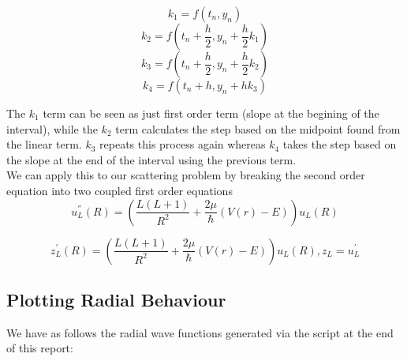\documentclass[11pt]{article} %
\begin{document}
\begin{equation}
k_1=f(t_n,y_n)
\end{equation}
\begin{equation}
k_2=f(t_n+\frac{h}{2},y_n+\frac{h}{2}k_1)
\end{equation}
\begin{equation}
k_3=f(t_n+\frac{h}{2},y_n+\frac{h}{2}k_2)
\end{equation}
\begin{equation}
k_4=f(t_n+h,y_n+hk_3)
\end{equation}

The $k_1$ term can be seen as just first order term (slope at the begining of the interval), while the $k_2$ term calculates the step based on the midpoint found from the linear term.  
$k_3$ repeats this process again whereas $k_4$ takes the step based on the slope at the end of the interval using the previous term. \\
We can apply this to our scattering problem by breaking the second order equation into two coupled first order equations
\begin{equation}
u_{L}^{''}(R)=\left(\frac{L(L+1)}{R^2}+\frac{2\mu}{\hbar}(V(r)-E)\right)u_{L}(R)
\end{equation}

\begin{equation}
z_{L}^{'}(R)=\left(\frac{L(L+1)}{R^2}+\frac{2\mu}{\hbar}(V(r)-E)\right)u_{L}(R),
z_{L}=u_{L}^{'}
\end{equation}

\newpage
\subsection{Plotting Radial Behaviour}
We have as follows the radial wave functions generated via the script at the end of this report:\\
\end{document}
